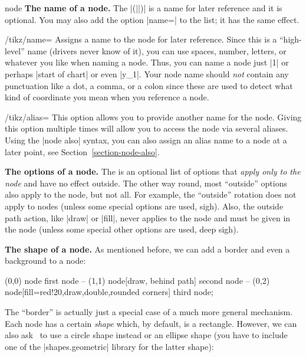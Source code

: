 \begin{pathoperation}{node}{%
    }
  \medskip
  \textbf{The name of a node.}
  The |(||)| is a name for later reference and it is
  optional. You may also add the option |name=| to the
   list; it has the same effect.

  \begin{key}{/tikz/name=}
    Assigns a name to the node for later reference. Since this is a
    ``high-level'' name (drivers never know of it), you can use spaces,
    number, letters, or whatever you like when naming a node. Thus, you
    can name a node just |1| or perhaps |start of chart| or even
    |y_1|. Your node name should \emph{not} contain any punctuation like
    a dot, a comma, or a colon since these are used to detect what kind
    of coordinate you mean when you reference a node.
  \end{key}

  \begin{key}{/tikz/alias=}
    This option allows you to provide another name for the
    node. Giving this option multiple times will allow you to access
    the node via several aliases. Using the |node also| syntax,
    you can also assign an alias name to a node at a later point, see
    Section~\ref{section-node-also}. 
  \end{key}
    
  \medskip
  \textbf{The options of a node.}
  The  is an optional list of options that \emph{apply
    only to the node} and have no effect outside. The other way round,
  most ``outside'' options also apply to the node, but not all. For
  example, the ``outside'' rotation does not apply to nodes (unless some
  special options are used, sigh). Also, the outside path action, like
  |draw| or |fill|, never applies to the node and must be given in the
  node (unless some special other options are used, deep sigh).

  \medskip
  \textbf{The shape of a node.}
  As mentioned before, we can add a border and even a background to a
  node:
\begin{codeexample}[]
\tikz \fill[fill=yellow!80!black]
      (0,0) node {first node}
   -- (1,1) node[draw, behind path] {second node}
   -- (0,2) node[fill=red!20,draw,double,rounded corners] {third node};
\end{codeexample}

  The ``border'' is actually just a special case of a much more general
  mechanism. Each node has a certain \emph{shape} which, by default, is
  a rectangle. However, we can also ask \tikzname\ to use a circle shape
  instead or an ellipse shape (you have to include one of the
  |shapes.geometric| library for the latter shape):


\end{pathoperation}
